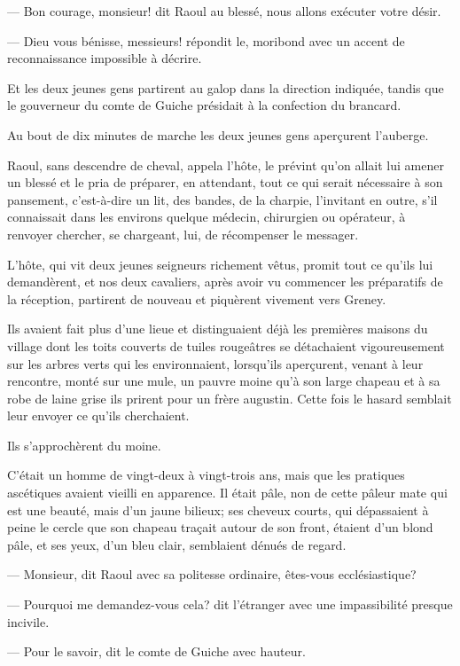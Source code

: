 — Bon courage, monsieur! dit Raoul au blessé, nous allons exécuter votre désir.

— Dieu vous bénisse, messieurs! répondit le, moribond avec un accent de reconnaissance impossible à décrire.

Et les deux jeunes gens partirent au galop dans la direction indiquée, tandis que le gouverneur du comte de Guiche présidait à la confection du brancard.

Au bout de dix minutes de marche les deux jeunes gens aperçurent l'auberge.

Raoul, sans descendre de cheval, appela l'hôte, le prévint qu'on allait lui amener un blessé et le pria de préparer, en attendant, tout ce qui serait nécessaire à son pansement, c'est-à-dire un lit, des bandes, de la charpie, l'invitant en outre, s'il connaissait dans les environs quelque médecin, chirurgien ou opérateur, à renvoyer chercher, se chargeant, lui, de récompenser le messager.

L'hôte, qui vit deux jeunes seigneurs richement vêtus, promit tout ce qu'ils lui demandèrent, et nos deux cavaliers, après avoir vu commencer les préparatifs de la réception, partirent de nouveau et piquèrent vivement vers Greney.

Ils avaient fait plus d'une lieue et distinguaient déjà les premières maisons du village dont les toits couverts de tuiles rougeâtres se détachaient vigoureusement sur les arbres verts qui les environnaient, lorsqu'ils aperçurent, venant à leur rencontre, monté sur une mule, un pauvre moine qu'à son large chapeau et à sa robe de laine grise ils prirent pour un frère augustin. Cette fois le hasard semblait leur envoyer ce qu'ils cherchaient.

Ils s'approchèrent du moine.

C'était un homme de vingt-deux à vingt-trois ans, mais que les pratiques ascétiques avaient vieilli en apparence. Il était pâle, non de cette pâleur mate qui est une beauté, mais d'un jaune bilieux; ses cheveux courts, qui dépassaient à peine le cercle que son chapeau traçait autour de son front, étaient d'un blond pâle, et ses yeux, d'un bleu clair, semblaient dénués de regard.

— Monsieur, dit Raoul avec sa politesse ordinaire, êtes-vous ecclésiastique?

— Pourquoi me demandez-vous cela? dit l'étranger avec une impassibilité presque incivile.

— Pour le savoir, dit le comte de Guiche avec hauteur.


